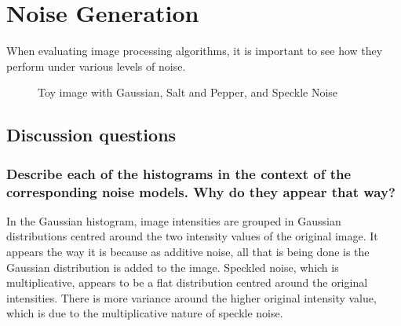 \section{Noise Generation}

When evaluating image processing algorithms, it is important to see how they perform under various levels of noise.


\begin{figure}[ht]
\centering
\end{figure}

\begin{figure}[ht]
\centering
	\caption{Toy image with Gaussian, Salt and Pepper, and Speckle Noise}
	\label{fig:noiseGeneration.toy}
\end{figure}
 

\subsection{Discussion questions}

\subsubsection{ Describe each of the histograms in the context of the corresponding noise models. Why do they appear
that way?}
In the Gaussian histogram, image intensities are grouped in Gaussian distributions centred around the two intensity values of the original image. It appears the way it is because as additive noise, all that is being done is the Gaussian distribution is added to the image. Speckled noise, which is multiplicative, appears to be a flat distribution centred around the original intensities. There is more variance around the higher original intensity value, which is due to the multiplicative nature of speckle noise.


